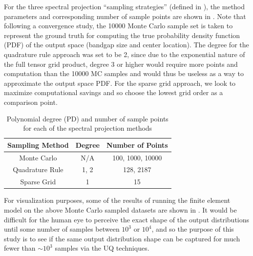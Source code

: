 \documentclass[preprint,review,12pt]{elsarticle}
\begin{document}
For the three spectral projection ``sampling strategies'' (defined in ), the method parameters and corresponding number of sample points are shown in . Note that following a convergence study, the 10000 Monte Carlo sample set is taken to represent the ground truth for computing the true probability density function (PDF) of the output space (bandgap size and center location). The degree for the quadrature rule approach was set to be 2, since due to the exponential nature of the full tensor grid product, degree 3 or higher would require more points and computation than the 10000 MC samples and would thus be useless as a way to approximate the output space PDF. For the sparse grid approach, we look to maximize computational savings and so choose the lowest grid order as a comparison point.
\begin{table}[H]
    \centering
    \small
    \caption{Polynomial degree (PD) and number of sample points for each of the spectral projection methods}
    \label{table:7D_gamma_sampling_strategies}
    \begin{tabular}{ccc} 
        \toprule
        Sampling Method & Degree & Number of Points \\
        \midrule
        Monte Carlo & N/A & 100, 1000, 10000 \\
        Quadrature Rule & 1, 2 & 128, 2187 \\
        Sparse Grid & 1 & 15 \\
        \bottomrule
    \end{tabular}
\end{table}

For visualization purposes, some of the results of running the finite element model on the above Monte Carlo sampled datasets are shown in . It would be difficult for the human eye to perceive the exact shape of the output distributions until some number of samples between $10^3$ or $10^4$, and so the purpose of this study is to see if the same output distribution shape can be captured for much fewer than $\sim 10^3$ samples via the UQ techniques.
\end{document}

